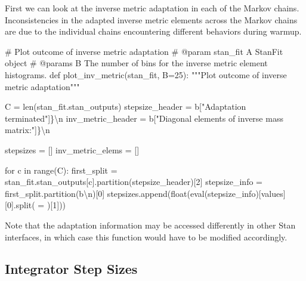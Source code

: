 \documentclass[
  letterpaper,
  DIV=11,
  numbers=noendperiod]{scrartcl}
\newenvironment{Shaded}{\begin{snugshade}}{\end{snugshade}}
\newcommand{\BuiltInTok}[1]{\textcolor[rgb]{0.00,0.23,0.31}{#1}}
\newcommand{\CharTok}[1]{\textcolor[rgb]{0.13,0.47,0.30}{#1}}
\newcommand{\CommentTok}[1]{\textcolor[rgb]{0.37,0.37,0.37}{#1}}
\newcommand{\ControlFlowTok}[1]{\textcolor[rgb]{0.00,0.23,0.31}{#1}}
\newcommand{\DecValTok}[1]{\textcolor[rgb]{0.68,0.00,0.00}{#1}}
\newcommand{\KeywordTok}[1]{\textcolor[rgb]{0.00,0.23,0.31}{#1}}
\newcommand{\NormalTok}[1]{\textcolor[rgb]{0.00,0.23,0.31}{#1}}
\newcommand{\OperatorTok}[1]{\textcolor[rgb]{0.37,0.37,0.37}{#1}}
\newcommand{\StringTok}[1]{\textcolor[rgb]{0.13,0.47,0.30}{#1}}
\begin{document}
First we can look at the inverse metric adaptation in each of the Markov
chains. Inconsistencies in the adapted inverse metric elements across
the Markov chains are due to the individual chains encountering
different behaviors during warmup.

\begin{Shaded}
\begin{Highlighting}[]
\CommentTok{\# Plot outcome of inverse metric adaptation}
\CommentTok{\# @param stan\_fit A StanFit object}
\CommentTok{\# @params B The number of bins for the inverse metric element histograms.}
\KeywordTok{def}\NormalTok{ plot\_inv\_metric(stan\_fit, B}\OperatorTok{=}\DecValTok{25}\NormalTok{):}
  \CommentTok{"""Plot outcome of inverse metric adaptation"""}
  
\NormalTok{  C }\OperatorTok{=} \BuiltInTok{len}\NormalTok{(stan\_fit.stan\_outputs)}
\NormalTok{  stepsize\_header }\OperatorTok{=} \StringTok{b\textquotesingle{}["Adaptation terminated"]\}}\CharTok{\textbackslash{}n}\StringTok{\textquotesingle{}}
\NormalTok{  inv\_metric\_header }\OperatorTok{=} \StringTok{b\textquotesingle{}["Diagonal elements of inverse mass matrix:"]\}}\CharTok{\textbackslash{}n}\StringTok{\textquotesingle{}}
  
\NormalTok{  stepsizes }\OperatorTok{=}\NormalTok{ []}
\NormalTok{  inv\_metric\_elems }\OperatorTok{=}\NormalTok{ []}
  
  \ControlFlowTok{for}\NormalTok{ c }\KeywordTok{in} \BuiltInTok{range}\NormalTok{(C):}
\NormalTok{    first\_split }\OperatorTok{=}\NormalTok{ stan\_fit.stan\_outputs[c].partition(stepsize\_header)[}\DecValTok{2}\NormalTok{]}
\NormalTok{    stepsize\_info }\OperatorTok{=}\NormalTok{ first\_split.partition(}\StringTok{b\textquotesingle{}}\CharTok{\textbackslash{}n}\StringTok{\textquotesingle{}}\NormalTok{)[}\DecValTok{0}\NormalTok{]}
\NormalTok{    stepsizes.append(}\BuiltInTok{float}\NormalTok{(}\BuiltInTok{eval}\NormalTok{(stepsize\_info)[}\StringTok{\textquotesingle{}values\textquotesingle{}}\NormalTok{][}\DecValTok{0}\NormalTok{].split(}\StringTok{\textquotesingle{} = \textquotesingle{}}\NormalTok{)[}\DecValTok{1}\NormalTok{]))}
\end{Highlighting}
\end{Shaded}

Note that the adaptation information may be accessed differently in
other Stan interfaces, in which case this function would have to be
modified accordingly.

\hypertarget{integrator-step-sizes}{%
\subsection{Integrator Step Sizes}\label{integrator-step-sizes}}
\end{document}
